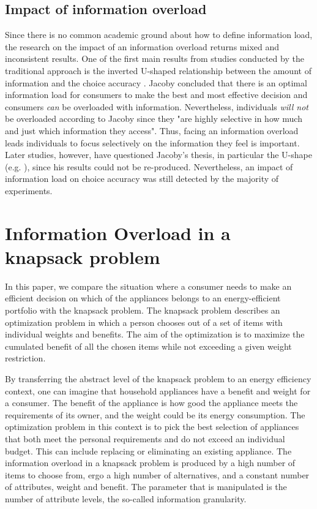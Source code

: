 \subsection{Impact of information overload}

Since there is no common academic ground about how to define information load, the research on the impact of an information overload returns mixed and inconsistent results.
One of the first main results from studies conducted by the traditional approach is the inverted U-shaped relationship between the amount of information and the choice accuracy \citep{Jacoby1974}. Jacoby concluded that there is an optimal information load for consumers to make the best and most effective decision and consumers \textit{can} be overloaded with information. Nevertheless, individuals \textit{will not} be overloaded according to Jacoby since they "are highly selective in how much and just which information they access". Thus, facing an information overload leads individuals to focus selectively on the information they feel is important.
Later studies, however, have questioned Jacoby's thesis, in particular the U-shape (e.g. \cite{Malhotra1982}), since his results could not be re-produced. Nevertheless, an impact of information load on choice accuracy was still detected by the majority of experiments.

\section{Information Overload in a knapsack problem}
\label{ch:Literature Review:sec:Information Overload in a knapsack problem}
In this paper, we compare the situation where a consumer needs to make an efficient decision on which of the appliances belongs to an energy-efficient portfolio with the knapsack problem. The knapsack problem describes an optimization problem in which a person chooses out of a set of items with individual weights and benefits. The aim of the optimization is to maximize the cumulated benefit of all the chosen items while not exceeding a given weight restriction.

By transferring the abstract level of the knapsack problem to an energy efficiency context, one can imagine that household appliances have a benefit and weight for a consumer. The benefit of the appliance is how good the appliance meets the requirements of its owner, and the weight could be its energy consumption. The optimization problem in this context is to pick the best selection of appliances that both meet the personal requirements and do not exceed an individual budget. This can include replacing or eliminating an existing appliance.
The information overload in a knapsack problem is produced by a high number of items to choose from, ergo a high number of alternatives, and a constant number of attributes, weight and benefit. The parameter that is manipulated is the number of attribute levels, the so-called information granularity.

